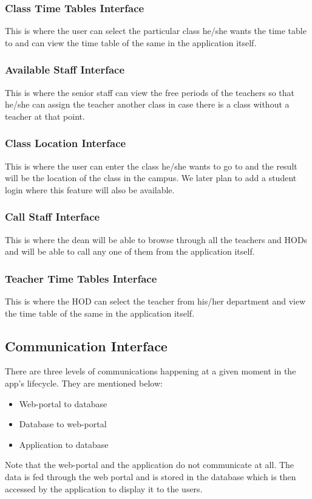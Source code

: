 \documentclass[BTech]{srmuthesis}
\begin{document}
\subsubsection{Class Time Tables Interface}
This is where the user can select the particular class he/she wants the time table to and can view the time table of the same in the application itself.
\subsubsection{Available Staff Interface}
This is where the senior staff can view the free periods of the teachers so that he/she can assign the teacher another class in case there is a class without a teacher at that point.
\subsubsection{Class Location Interface}
This is where the user can enter the class he/she wants to go to and the result will be the location of the class in the campus. We later plan to add a student login where this feature will also be available.
\subsubsection{Call Staff Interface}
This is where the dean will be able to browse through all the teachers and HODs and will be able to call any one of them from the application itself.
\subsubsection{Teacher Time Tables Interface}
This is where the HOD can select the teacher from his/her department and view the time table of the same in the application itself.
\subsection{Communication Interface}
There are three levels of communications happening at a given moment in the app's lifecycle. They are mentioned below:
\begin{itemize}
\item Web-portal to database
\item Database to web-portal
\item Application to database
\end{itemize}
Note that the web-portal and the application do not communicate at all. The data is fed through the web portal and is stored in the database which is then accessed by the application to display it to the users. 
\end{document}
